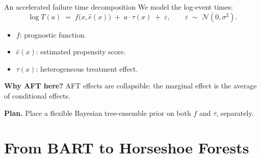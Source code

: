 \documentclass[10pt,aspectratio=169]{beamer}
\newcommand{\N}{\mathcal{N}}
\begin{document}
\begin{frame}{An accelerated failure time decomposition}
We model the log-event times:
\[
\log T(a) \;=\; f\bigl(x, \hat e(x)\bigr) \;+\; a \cdot \tau(x) \;+\; \varepsilon, \qquad \varepsilon \;\sim\; \N(0, \sigma^2).
\]

\begin{itemize}
  \item $f$: prognostic function.
  \item $\hat e(x)$: estimated propensity score.
  \item $\tau(x)$: heterogeneous treatment effect.
\end{itemize}
\bigskip

\textbf{Why AFT here?} AFT effects are collapsible: the marginal effect is the average of conditional effects.

\bigskip
\textbf{Plan.} Place a flexible Bayesian tree-ensemble prior on both $f$ and $\tau$, separately.
\end{frame}

\section{From BART to Horseshoe Forests}
\end{document}
